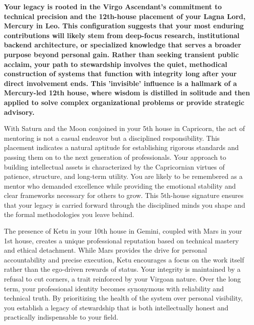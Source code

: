 \label{topic71}

{\fontsize{9.5}{13.8}\selectfont\bfseries\color{DeepSlate} Your legacy is rooted in the Virgo Ascendant's commitment to technical precision and the 12th-house placement of your Lagna Lord, Mercury in Leo. This configuration suggests that your most enduring contributions will likely stem from deep-focus research, institutional backend architecture, or specialized knowledge that serves a broader purpose beyond personal gain. Rather than seeking transient public acclaim, your path to stewardship involves the quiet, methodical construction of systems that function with integrity long after your direct involvement ends. This 'invisible' influence is a hallmark of a Mercury-led 12th house, where wisdom is distilled in solitude and then applied to solve complex organizational problems or provide strategic advisory.}\par\vspace{2mm}

{\fontsize{9}{13}\selectfont With Saturn and the Moon conjoined in your 5th house in Capricorn, the act of mentoring is not a casual endeavor but a disciplined responsibility. This placement indicates a natural aptitude for establishing rigorous standards and passing them on to the next generation of professionals. Your approach to building intellectual assets is characterized by the Capricornian virtues of patience, structure, and long-term utility. You are likely to be remembered as a mentor who demanded excellence while providing the emotional stability and clear frameworks necessary for others to grow. This 5th-house signature ensures that your legacy is carried forward through the disciplined minds you shape and the formal methodologies you leave behind.}\par\vspace{1.8mm}

{\fontsize{9}{13}\selectfont The presence of Ketu in your 10th house in Gemini, coupled with Mars in your 1st house, creates a unique professional reputation based on technical mastery and ethical detachment. While Mars provides the drive for personal accountability and precise execution, Ketu encourages a focus on the work itself rather than the ego-driven rewards of status. Your integrity is maintained by a refusal to cut corners, a trait reinforced by your Virgoan nature. Over the long term, your professional identity becomes synonymous with reliability and technical truth. By prioritizing the health of the system over personal visibility, you establish a legacy of stewardship that is both intellectually honest and practically indispensable to your field.}\par\vspace{1.8mm}

